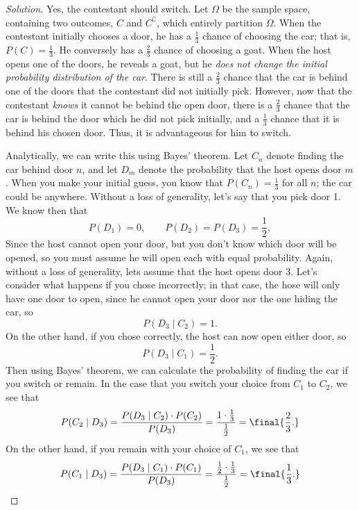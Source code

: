 \documentclass[10pt, physics, diagram]{homework}
\begin{document}
	\begin{proof}[Solution]
		Yes, the contestant should switch.
		Let $\Omega$ be the sample space, containing two outcomes, $C$ and $C^\complement$, which entirely partition $\Omega$.
		When the contestant initially chooses a door, he has a $\frac{1}{3}$ chance of choosing the car; that is, $P(C) = \frac{1}{3}$.
		He conversely has a $\frac{2}{3}$ chance of choosing a goat.
		When the host opens one of the doors, he reveals a goat, but he \emph{does not change the initial probability distribution of the car}.
		There is still a $\frac{2}{3}$ chance that the car is behind one of the doors that the contestant did not initially pick.
		However, now that the contestant \emph{knows} it cannot be behind the open door, there is a $\frac{2}{3}$ chance that the car is behind the door which he did not pick initially, and a $\frac{1}{3}$ chance that it is behind his chosen door. 
		Thus, it is advantageous for him to switch.

		Analytically, we can write this using Bayes' theorem.
		Let $C_n$ denote finding the car behind door $n$,
		and let $D_m$ denote the probability that the host opens door $m$.
		When you make your initial guess, you know that $P(C_n) = \frac{1}{3}$ for all $n$; the car could be anywhere.
		Without a loss of generality, let's say that you pick door 1.
		We know then that
		\[ P(D_1) = 0,\qquad P(D_2) = P(D_3) = \frac{1}{2}, \]
		Since the host cannot open your door, but you don't know which door will be opened, so you must assume he will open each with equal probability.
		Again, without a loss of generality, lets assume that the host opens door 3.
		Let's consider what happens if you chose incorrectly; in that case, the hose will only have one door to open, since he cannot open your door nor the one hiding the car, so
		\[ P(D_3 \mid C_2) = 1. \]
		On the other hand, if you chose correctly, the host can now open either door, so
		\[ P(D_3 \mid C_1) = \frac{1}{2}. \]
		Then using Bayes' theorem, we can calculate the probability of finding the car if you switch or remain.
		In the case that you switch your choice from $C_1$ to $C_2$, we see that
		\[ P(C_2 \mid D_3) = \frac{P(D_3 \mid C_2)\cdot P(C_2)}{P(D_3)} = \frac{1 \cdot \frac{1}{3}}{\frac{1}{2}} = \final{\frac{2}{3}.}\]
		On the other hand, if you remain with your choice of $C_1$, we see that
		\[ 
			P(C_1 \mid D_3) = \frac{P(D_3 \mid C_1)\cdot P(C_1)}{P(D_3)} = \frac{\frac{1}{2}\cdot\frac{1}{3}}{\frac{1}{2}} = \final{\frac{1}{3}.}\qedhere	
		\]
	\end{proof}
\end{document}
